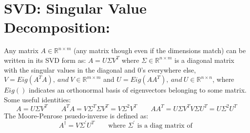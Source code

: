 \documentclass[12pt,twoside]{article}
\newcommand{\R}{\mathbb{R}}
\begin{document}
\section*{SVD: Singular Value Decomposition:}
Any matrix $A \in \R^{n\times m}$ (any matrix though even if the dimensions match) can be written in its SVD form as: $A = U\Sigma V^T$ where $\Sigma \in \R^{n \times m}$ is a diagonal matrix with the singular values in the diagonal and 0's everywhere else, $V = Eig(A^TA), \ and \ V \in \R^{m\times m}$ and $U = Eig(AA^T), \ and \ U \in \R^{n \times n}$, where $Eig()$ indicates an orthonormal basis of eigenvectors belonging to some matrix. Some useful identities:
$$
    A = U \Sigma V^T \qquad  A^TA = V\Sigma^T \Sigma V^T = V\Sigma^2 V^T \qquad AA^T = U \Sigma V^T V \Sigma U^T = U \Sigma^2 U^T
$$
The Moore-Penrose psuedo-inverse is defined as:
$$
    A^\dagger = V\Sigma^\prime U^T \qquad \text{where } \Sigma^\prime \text{ is a diag matrix of }
$$
\end{document}
